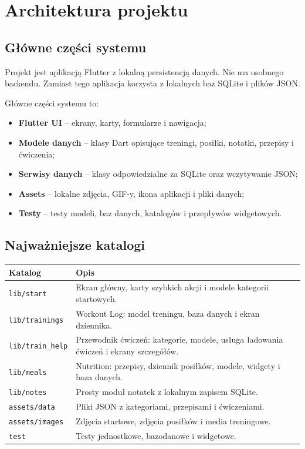 \documentclass[12pt,a4paper]{article}
\begin{document}
\section{Architektura projektu}

\subsection{Główne części systemu}

Projekt jest aplikacją Flutter z lokalną persistencją danych. Nie ma osobnego backendu. Zamiast tego aplikacja korzysta z lokalnych baz SQLite i plików JSON.

Główne części systemu to:

\begin{itemize}
    \item \textbf{Flutter UI} -- ekrany, karty, formularze i nawigacja;
    \item \textbf{Modele danych} -- klasy Dart opisujące treningi, posiłki, notatki, przepisy i ćwiczenia;
    \item \textbf{Serwisy danych} -- klasy odpowiedzialne za SQLite oraz wczytywanie JSON;
    \item \textbf{Assets} -- lokalne zdjęcia, GIF-y, ikona aplikacji i pliki danych;
    \item \textbf{Testy} -- testy modeli, baz danych, katalogów i przepływów widgetowych.
\end{itemize}

\subsection{Najważniejsze katalogi}

\begin{longtable}{p{}p{}}
\toprule
\textbf{Katalog} & \textbf{Opis} \\
\midrule
\texttt{lib/start} & Ekran główny, karty szybkich akcji i modele kategorii startowych. \\
\texttt{lib/trainings} & Workout Log: model treningu, baza danych i ekran dziennika. \\
\texttt{lib/train\_help} & Przewodnik ćwiczeń: kategorie, modele, usługa ładowania ćwiczeń i ekrany szczegółów. \\
\texttt{lib/meals} & Nutrition: przepisy, dziennik posiłków, modele, widgety i baza danych. \\
\texttt{lib/notes} & Prosty moduł notatek z lokalnym zapisem SQLite. \\
\texttt{assets/data} & Pliki JSON z kategoriami, przepisami i ćwiczeniami. \\
\texttt{assets/images} & Zdjęcia startowe, zdjęcia posiłków i media treningowe. \\
\texttt{test} & Testy jednostkowe, bazodanowe i widgetowe. \\
\bottomrule
\end{longtable}
\end{document}
